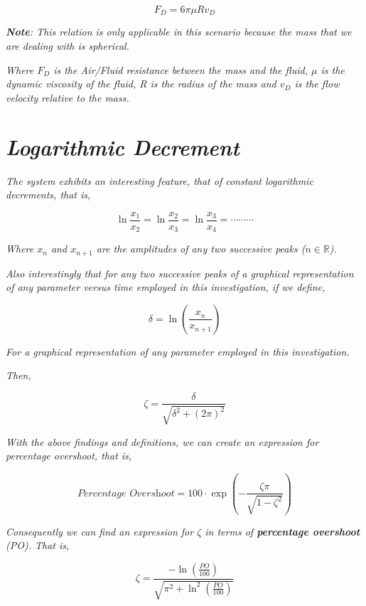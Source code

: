         $$F_D = 6\pi\mu Rv_D$$
            
    \textit{\textbf{Note}: This relation is only applicable in this scenario because the mass that we are dealing with is spherical.}
            
    \textit{Where $F_D$ is the Air/Fluid resistance between the mass and the fluid, $\mu$ is the dynamic viscosity of the fluid, R is the radius of the mass and $v_D$ is the flow velocity relative to the mass.}
            
\section{\textit{Logarithmic Decrement}}
            
    \textit{The system exhibits an interesting feature, that of constant logarithmic decrements, that is,}
            
        $$\ln{\frac{x_1}{x_2}} = \ln{\frac{x_2}{x_3}} = \ln{\frac{x_3}{x_4}} = \cdots\cdots\cdots$$
            
    \textit{Where $x_n$ and $x_{n + 1}$ are the amplitudes of any two successive peaks ($n \in \mathbb{R}$).}
            
    \textit{Also interestingly that for any two successive peaks of a graphical representation of any parameter versus time employed in this investigation, if we define,}
            
        $$\delta = \ln{\left(\frac{x_n}{x_{n + 1}}\right)}$$
            
    \textit{For a graphical representation of any parameter employed in this investigation.}
            
    \textit{Then,}
            
        $$\zeta = \frac{\delta}{\sqrt{\delta^2 + \left(2\pi\right)^2}}$$
            
    \textit{With the above findings and definitions, we can create an expression for percentage overshoot, that is,}
            
        $$\textit{Percentage Overshoot} = 100\cdot\exp{\left(-\frac{\zeta\pi}{\sqrt{1 - \zeta^2}}\right)}$$
            
    \textit{Consequently we can find an expression for $\zeta$ in terms of \textbf{percentage overshoot} (PO). That is,}
            
        $$\zeta = \frac{-\ln{\left(\frac{PO}{100}\right)}}{\sqrt{\pi^2 + \ln^2{\left(\frac{PO}{100}\right)}}}$$
            
